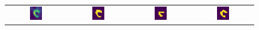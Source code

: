 \begin{figure}[htbp]
{\begin{tabular}{cccc}
        \includegraphics[width=0.22\textwidth]{images/segs/coronal_input.png} &
        \includegraphics[width=0.22\textwidth]{images/segs/coronal_gt.png} &
        \includegraphics[width=0.22\textwidth]{images/segs/coronal_pred.png} &
        \includegraphics[width=0.22\textwidth]{images/segs/coronal_pred_SP.png} \\



\end{tabular}}
\end{figure}
